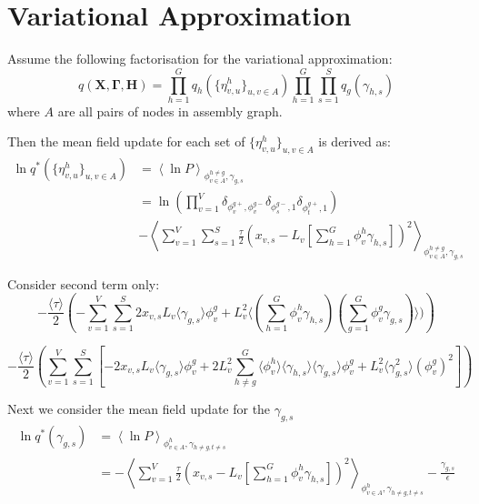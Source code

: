 \documentclass[10pt]{article}
\begin{document}
\section{Variational Approximation}

Assume the following factorisation for the variational approximation:
\begin{equation}
q(\mathbf{X},\mathbf{\Gamma},\mathbf{H})  =  \prod_{h=1}^G q_h(\{ \eta^h_{v,u} \} _{u,v \in A}) \prod_{h=1}^G \prod_{s=1}^S q_g(\gamma_{h,s})
\end{equation}
where $A$ are all pairs of nodes in assembly graph.

Then the mean field update for each set of $ \{\eta^h_{v,u}\}_{u,v \in A}$ is derived as:
\begin{align}
\ln q^*( \{ \eta^h_{v,u} \} _{u,v \in A}) & =  \left\langle \ln P \right\rangle _{ \phi^{h \neq g}_{v \in A},\gamma_{g,s}} \\
& =  \ln \left( \prod_{v=1}^V \delta_{ \phi^{g+}_v, \phi^{g-}_v} \delta_{\phi^{g-}_s,1}  \delta_{\phi^{g+}_t,1} \right) \\
& - \left\langle \sum_{v=1}^V \sum_{s=1}^S \frac{\tau}{2} \left( x_{v,s} - L_v[\sum_{h=1}^G \phi^h_v \gamma_{h,s}] \right)^2 \right\rangle _{ \phi^{h \neq g}_{v \in A},\gamma_{g,s}}
\end{align}

Consider second term only:
\begin{equation}
 - \frac{\langle \tau \rangle}{2}  \left ( 
- \sum_{v=1}^V \sum_{s=1}^S 2 x_{v,s} L_v \langle \gamma_{g,s} \rangle \phi^{g}_v
+ L_v^2 \langle (\sum_{h=1}^G \phi^h_v \gamma_{h,s}) (\sum_{g=1}^G \phi^g_v \gamma_{g,s}) \rangle)
\right )
\end{equation}

\begin{equation}
 - \frac{\langle \tau \rangle}{2} \left ( 
 \sum_{v=1}^V \sum_{s=1}^S \left [ -2 x_{v,s} L_v \langle \gamma_{g,s} \rangle \phi^{g}_v
+ 2 L_v^ 2 \sum_{h \neq g }^G \langle \phi^h_v \rangle \langle \gamma_{h,s} \rangle \langle \gamma_{g,s} \rangle \phi^{g}_v
+ L_v^2 \langle \gamma_{g,s}^2 \rangle (\phi^{g}_v)^2
\right]
\right )
\end{equation}

Next we consider the mean field update for the $\gamma_{g,s}$
\begin{align}
\ln q^*(\gamma_{g,s}) & =  \left\langle \ln P \right\rangle_{ \phi^{h}_{v \in A},\gamma_{h \neq g,t \neq s}} \\
& =  - \left\langle \sum_{v=1}^V \frac{\tau}{2}\left( x_{v,s} - L_v[\sum_{h=1}^G \phi^h_v \gamma_{h,s}] \right)^2 \right\rangle _{\phi^{h}_{v \in A},\gamma_{h \neq g,t \neq s}} - \frac{\gamma_{g,s}}{\epsilon}
\end{align}
\end{document}
